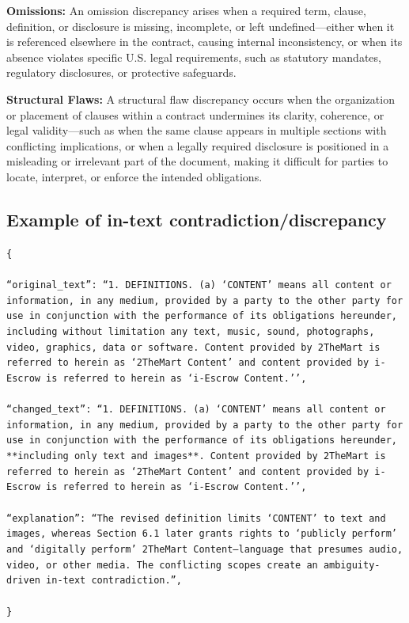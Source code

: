\begin{tcolorbox}[breakable,colback=lightestgray,colframe=black,title=\textbf{Eval\_3 L2: In-Text Discrepancy Detection Prompt}]
\textbf{Omissions:}
An omission discrepancy arises when a required term, clause, definition, or disclosure is missing, incomplete, or left undefined—either when it is referenced elsewhere in the contract, causing internal inconsistency, or when its absence violates specific U.S. legal requirements, such as statutory mandates, regulatory disclosures, or protective safeguards.

\textbf{Structural Flaws:}
A structural flaw discrepancy occurs when the organization or placement of clauses within a contract undermines its clarity, coherence, or legal validity—such as when the same clause appears in multiple sections with conflicting implications, or when a legally required disclosure is positioned in a misleading or irrelevant part of the document, making it difficult for parties to locate, interpret, or enforce the intended obligations.

\subsection*{\textbf{Example of in-text contradiction/discrepancy}}

{\footnotesize
\texttt{\{\\\\
``original\_text'': ``1. DEFINITIONS. (a) `CONTENT' means all content or information, in any medium, provided by a party to the other party for use in conjunction with the performance of its obligations hereunder, including without limitation any text, music, sound, photographs, video, graphics, data or software. Content provided by 2TheMart is referred to herein as `2TheMart Content' and content provided by i-Escrow is referred to herein as `i-Escrow Content.'',\\\\
``changed\_text'': ``1. DEFINITIONS. (a) `CONTENT' means all content or information, in any medium, provided by a party to the other party for use in conjunction with the performance of its obligations hereunder, **including only text and images**. Content provided by 2TheMart is referred to herein as `2TheMart Content' and content provided by i-Escrow is referred to herein as `i-Escrow Content.'',\\\\
``explanation'': ``The revised definition limits `CONTENT' to text and images, whereas Section 6.1 later grants rights to `publicly perform' and `digitally perform' 2TheMart Content—language that presumes audio, video, or other media. The conflicting scopes create an ambiguity-driven in-text contradiction.'',\\\\
\}}
}


\end{tcolorbox}
